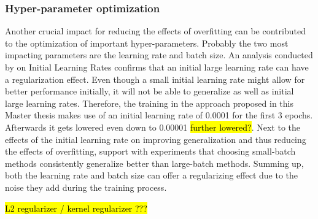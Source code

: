 \subsubsection{Hyper-parameter optimization}
Another crucial impact for reducing the effects of overfitting can be contributed to the optimization of important hyper-parameters. Probably the two most impacting parameters are the learning rate and batch size.
\newline\newline
An analysis conducted by \citet{Yuanzhi:2019:RegularizationInitialLargeLearningRate} on Initial Learning Rates confirms that an initial large learning rate can have a regularization effect. Even though a small initial learning rate might allow for better performance initially, it will not be able to generalize as well as initial large learning rates. Therefore, the training in the approach proposed in this Master thesis makes use of an initial learning rate of 0.0001 for the first 3 epochs. Afterwards it gets lowered even down to 0.00001 \hl{further lowered?}.
\newline\newline
Next to the effects of the initial learning rate on improving generalization and thus reducing the effects of overfitting, \citet{Keskar:2016:LargeBatchTrainingGeneralization} support with experiments that choosing small-batch methods consistently generalize better than large-batch methods. Summing up, both the learning rate and batch size can offer a regularizing effect due to the noise they add during the training process.

\hl{L2 regularizer / kernel regularizer ???}
